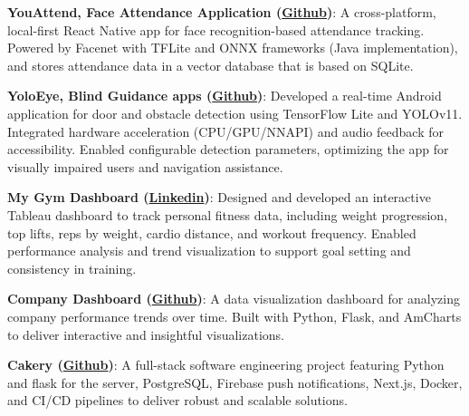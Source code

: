 \documentclass[letterpaper,11pt]{article}
\newcommand{\resumeItem}[2]{
  \item\small{
    \textbf{#1}{: #2 \vspace{-2pt}}
  }
}
\newcommand{\resumeSubItem}[2]{\resumeItem{#1}{#2}\vspace{-4pt}}
\begin{document}
    \resumeSubItem{YouAttend, Face Attendance Application (\href{https://github.com/marksamfd/YouAttend}{Github})}
      {A cross-platform, local-first React Native app for face recognition-based attendance tracking. Powered by Facenet with TFLite and ONNX frameworks (Java implementation), and stores attendance data in a vector database that is based on SQLite.}
    \resumeSubItem{YoloEye, Blind Guidance apps (\href{https://github.com/marksamfd/YoloEye}{Github})}
      {Developed a real-time Android application for door and obstacle detection using TensorFlow Lite and YOLOv11. Integrated hardware acceleration (CPU/GPU/NNAPI) and audio feedback for accessibility. Enabled configurable detection parameters, optimizing the app for visually impaired users and navigation assistance.}
   
    \resumeSubItem{My Gym Dashboard (\href{https://www.linkedin.com/posts/marksamfd_im-happy-to-share-this-gym-dashboard-project-activity-7311015022229434368-KYmF?utm_source=share&utm_medium=member_desktop&rcm=ACoAADC1e4AB5Kixe7cxDjpvmjx8iTcK0b6p8Y8}{Linkedin})}
      {Designed and developed an interactive Tableau dashboard to track personal fitness data, including weight progression, top lifts, reps by weight, cardio distance, and workout frequency. Enabled performance analysis and trend visualization to support goal setting and consistency in training.}
   
    \resumeSubItem{Company Dashboard (\href{https://github.com/marksamfd/Data-Analysis-Dashboard}{Github})}
      {A data visualization dashboard for analyzing company performance trends over time. Built with Python, Flask, and AmCharts to deliver interactive and insightful visualizations.}
   
   
    \resumeSubItem{Cakery (\href{https://github.com/marksamfd/CakeryMarkDEV}{Github})}
      {A full-stack software engineering project featuring Python and flask for the server, PostgreSQL, Firebase push notifications, Next.js, Docker, and CI/CD pipelines to deliver robust and scalable solutions.}

   
\end{document}
